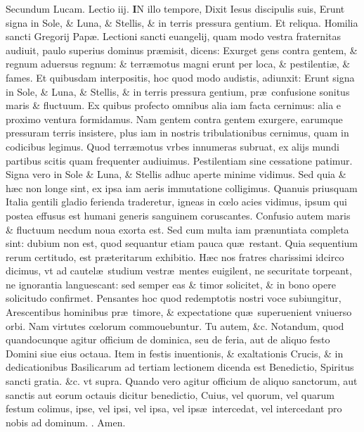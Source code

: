 \documentclass[a5paper,10pt]{book}
\makeatletter
\def\rightmarginnote{%
	\lrmarginnote{\hskip\columnwidth \hskip -1em}}
\DeclareRobustCommand{\Rbar}{\vers@resp{0pt}{R}}
\newcommand{\vers@resp@sym}{\raisebox{0.2ex}{\rotatebox[origin=c]{-20}{$\m@th\rceil$}}}
\newcommand{\vers@resp}[2]{%
  {\ooalign{\hidewidth\kern#1\vers@resp@sym\hidewidth\cr#2\cr}}%
}%
\def\ae{æ}
\def\oe{œ}
\makeatother
\begin{document}
\begin{multicols*}{2}
\newline \color{red} Secundum Lucam. \hfill Lectio iij.\color{black}
\vspace{-1em}
\lettrine[lines=2]{\bfseries \color{red} I}{}N\rightmarginnote{Lu.\\21.} illo tempore, Dixit Iesus discipulis suis, Erunt signa in Sole, \& Luna, \& Stellis, \& in terris pressura gentium. \color{red} Et reliqua. \color{black}
\newline \color{red} Homilia sancti Gregorij Pap\ae . \color{black}
\newline \color{red} L\color{black}ectioni sancti euangelij, quam modo vestra fraternitas audiuit, paulo superius dominus pr\ae misit, dicens:
Exurget gens contra gentem, \& regnum aduersus regnum: \& terr\ae motus magni erunt per loca, \& pestilenti\ae , \& fames. 
Et quibusdam interpositis, hoc quod modo audistis, adiunxit: Erunt signa in Sole, \& Luna, \& Stellis, \& in terris pressura gentium, pr\ae \ confusione sonitus maris \& fluctuum.
Ex quibus profecto omnibus alia iam facta cernimus: alia e proximo ventura formidamus.
Nam gentem contra gentem exurgere, earumque pressuram terris insistere, plus iam in nostris tribulationibus cernimus, quam in codicibus legimus.
Quod terr\ae motus vrbes innumeras subruat, ex alijs mundi partibus scitis quam frequenter audiuimus.
Pestilentiam sine cessatione patimur.
Signa vero in Sole \& Luna, \& Stellis adhuc aperte minime vidimus.
Sed quia \& h\ae c non longe sint, ex ipsa iam aeris immutatione colligimus.
Quanuis priusquam Italia gentili gladio ferienda traderetur, igneas in c\oe lo acies vidimus, ipsum qui postea effusus est humani generis sanguinem coruscantes.
Confusio autem maris \& fluctuum necdum noua exorta est.
Sed cum multa iam pr\ae nuntiata completa sint: dubium non est, quod sequantur etiam pauca qu\ae \ restant.
Quia sequentium rerum certitudo, est pr\ae teritarum exhibitio.
H\ae c nos fratres charissimi idcirco dicimus, vt ad cautel\ae \ studium vestr\ae \ mentes euigilent, ne securitate torpeant, ne ignorantia languescant: sed semper eas \& timor solicitet, \& in bono opere solicitudo confirmet.
Pensantes hoc quod redemptotis nostri voce subiungitur, Arescentibus hominibus pr\ae \ timore, \& expectatione qu\ae \ superuenient vniuerso orbi.
Nam virtutes c\oe lorum commouebuntur.
Tu autem, \&c.
\newline {} \color{red} Notandum, quod quandocunque agitur officium de dominica, seu de feria, aut de aliquo festo Domini siue eius octaua. \color{black}
\newline {} \color{red} Item in festis inuentionis, \& exaltationis Crucis, \& in dedicationibus Basilicarum ad tertiam lectionem dicenda est Benedictio, \color{black} Spiritus sancti gratia. \color{red} \&c. vt supra. Quando vero agitur officium de aliquo sanctorum, aut sanctis aut eorum octauis dicitur benedictio, \color{black} Cuius, \color{red} vel \color{black} quorum, \color{red} vel \color{black} quarum festum colimus, ipse, \color{red} vel \color{black} ipsi, \color{red} vel \color{black} ipsa, \color{red} vel \color{black} ips\ae \ intercedat, \color{red} vel \color{black} intercedant pro nobis ad dominum. \color{red} \Rbar . \color{black} Amen.

\end{multicols*}
\end{document}
